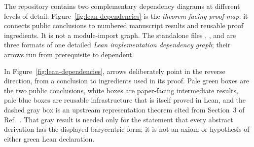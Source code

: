 \documentclass[aps,pra,11pt,onecolumn,nofootinbib,tightenlines]{revtex4-2}
\begin{document}
The repository contains two complementary dependency diagrams at different
levels of detail. Figure~\ref{fig:lean-dependencies} is the \emph{theorem-facing proof
map}: it connects public conclusions to numbered manuscript results and
reusable proof ingredients. It is not a module-import graph. The standalone
files , , and
 are three formats of one detailed
\emph{Lean implementation dependency graph}; their arrows run from prerequisite
to dependent.

In Figure~\ref{fig:lean-dependencies}, arrows deliberately point in the reverse
direction, from a conclusion to ingredients used in its proof. Pale green boxes
are the two public conclusions, white boxes are paper-facing intermediate
results, pale blue boxes are reusable infrastructure that is itself proved in
Lean, and the dashed gray box is an upstream representation theorem cited from
Section~3 of Ref.~\cite{rubboli2026complete}. That gray result is needed only
for the statement that every abstract derivation has the displayed barycentric
form; it is not an axiom or hypothesis of either green Lean declaration.
\end{document}
